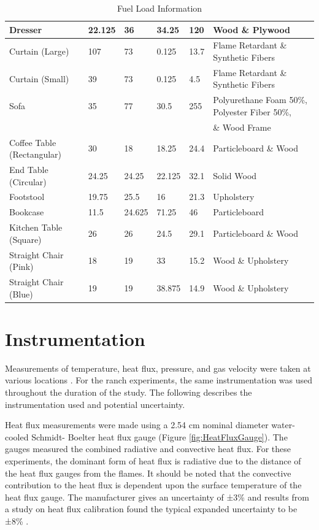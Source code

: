 \documentclass[12pt,oneside]{book}
\begin{document}
\begin{table}
{\begin{tabular}{|l|l|l|l|l|l|}
Dresser & 22.125 & 36 & 34.25 & 120 & Wood \& Plywood \\ \hline
Curtain (Large) & 107 & 73 & 0.125 & 13.7 & Flame Retardant \& Synthetic Fibers \\ \hline
Curtain (Small) & 39 & 73 & 0.125 & 4.5 & Flame Retardant \& Synthetic Fibers \\ \hline
Sofa & 35 & 77 & 30.5 & 255 & Polyurethane Foam 50\%, Polyester Fiber 50\%,\\&&&&& \& Wood Frame \\ \hline
Coffee Table (Rectangular) & 30 & 18 & 18.25 & 24.4 & Particleboard \& Wood \\ \hline
End Table (Circular) & 24.25 & 24.25 & 22.125 & 32.1 & Solid Wood \\ \hline
Footstool & 19.75 & 25.5 & 16 & 21.3 & Upholstery \\ \hline
Bookcase & 11.5 & 24.625 & 71.25 & 46 & Particleboard \\ \hline
Kitchen Table (Square) & 26 & 26 & 24.5 & 29.1 & Particleboard \& Wood \\ \hline
Straight Chair (Pink) & 18 & 19 & 33 & 15.2 & Wood \& Upholstery \\ \hline
Straight Chair (Blue) & 19 & 19 & 38.875 & 14.9 & Wood \& Upholstery \\ \hline
\end{tabular}}
\caption{Fuel Load Information}
\label{table:fuel_weights}
\end{table}

\section{Instrumentation}

Measurements of temperature, heat flux, pressure, and gas velocity were taken at various locations . For the ranch experiments, the same instrumentation was used throughout the duration of the study. The following describes the instrumentation used and potential uncertainty.

Heat flux measurements were made using a 2.54 cm nominal diameter water-cooled Schmidt- Boelter heat flux gauge (Figure \ref{fig:HeatFluxGauge}). The gauges measured the combined radiative and convective heat flux. For these experiments, the dominant form of heat flux is radiative due to the distance of the heat flux gauges from the flames. It should be noted that the convective contribution to the heat flux is dependent upon the surface temperature of the heat flux gauge. The manufacturer gives an uncertainty of ±3\% and results from a study on heat flux calibration found the typical expanded uncertainty to be ±8\% \cite{HeatFluxRoundRobin}.
\end{document}
